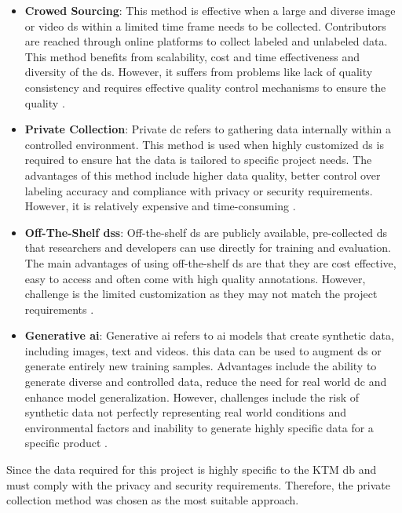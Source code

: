 \begin{itemize}
    \item \textbf{Crowed Sourcing}: This method is effective when a large and diverse image or video \gls{ds} within a limited time frame needs to be collected. Contributors are reached through online platforms to collect labeled and unlabeled data. This method benefits from scalability, cost and time effectiveness and diversity of the \gls{ds}. However, it suffers from problems like lack of quality consistency and requires effective quality control mechanisms to ensure the quality \cite{AIMultiple_Computer_Vision_Training_Data}.
    \item \textbf{Private Collection}: Private \gls{dc} refers to gathering data internally within a controlled environment. This method is used when highly customized \gls{ds} is required to ensure hat the data is tailored to specific project needs. The advantages of this method include higher data quality, better control over labeling accuracy and compliance with privacy or security requirements. However, it is relatively expensive and time-consuming \cite{AIMultiple_Computer_Vision_Training_Data}.
    \item \textbf{Off-The-Shelf \gls{ds}s}: Off-the-shelf \gls{ds} are publicly available, pre-collected \gls{ds} that researchers and developers can use directly for training and evaluation. The main advantages of using off-the-shelf \gls{ds} are that they are cost effective, easy to access and often come with high quality annotations. However, challenge is the limited customization as they may not match the project requirements \cite{AIMultiple_Computer_Vision_Training_Data}.
    \item \textbf{Generative \gls{ai}}: Generative \gls{ai} refers to \gls{ai} models that create synthetic data, including images, text and videos. this data can be used to augment \gls{ds} or generate entirely new training samples. Advantages include the ability to generate diverse and controlled data, reduce the need for real world \gls{dc} and enhance model generalization. However, challenges include the risk of synthetic data not perfectly representing real world conditions and environmental factors and inability to generate highly specific data for a specific product \cite{AIMultiple_Computer_Vision_Training_Data}.
\end{itemize}

Since the data required for this project is highly specific to the KTM \gls{db} and must comply with the privacy and security requirements. Therefore, the private collection method was chosen as the most suitable approach.

